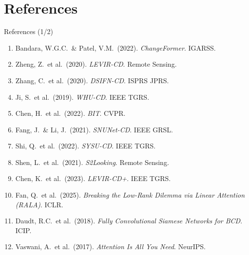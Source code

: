 \documentclass[aspectratio=169]{beamer}
\begin{document}
\section*{References}

\begin{frame}{References (1/2)}
\footnotesize
\begin{enumerate}
\item Bandara, W.G.C.\ \& Patel, V.M.\ (2022). \textit{ChangeFormer}. IGARSS.
\item Zheng, Z.\ et al.\ (2020). \textit{LEVIR-CD}. Remote Sensing.
\item Zhang, C.\ et al.\ (2020). \textit{DSIFN-CD}. ISPRS JPRS.
\item Ji, S.\ et al.\ (2019). \textit{WHU-CD}. IEEE TGRS.
\item Chen, H.\ et al.\ (2022). \textit{BIT}. CVPR.
\item Fang, J.\ \& Li, J.\ (2021). \textit{SNUNet-CD}. IEEE GRSL.
\item Shi, Q.\ et al.\ (2022). \textit{SYSU-CD}. IEEE TGRS.
\item Shen, L.\ et al.\ (2021). \textit{S2Looking}. Remote Sensing.
\item Chen, K.\ et al.\ (2023). \textit{LEVIR-CD+}. IEEE TGRS.
\item Fan, Q.\ et al.\ (2025). \textit{Breaking the Low-Rank Dilemma via Linear Attention (RALA)}. ICLR.
\item Daudt, R.C.\ et al.\ (2018). \textit{Fully Convolutional Siamese Networks for BCD}. ICIP.
\item Vaswani, A.\ et al.\ (2017). \textit{Attention Is All You Need}. NeurIPS.
\end{enumerate}
\end{frame}
\end{document}
